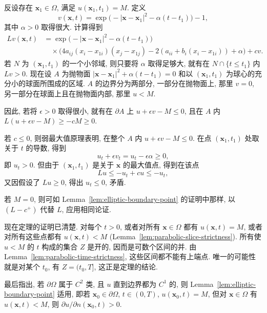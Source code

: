 \begin{Proof}
反设存在 $\bm{x}_1\in\Omega$, 满足 $u(\bm{x}_1,t_1)=M$. 定义
\begin{equation}\label{eq:parabolic-time-propagation-barrier}
v(\bm{x},t)=\exp\bigl(-|\bm{x}-\bm{x}_1|^2-\alpha(t-t_1)\bigr)-1,
\end{equation}
其中 $\alpha>0$ 取得很大. 计算得到\[
\begin{aligned}
Lv(\bm{x},t)&=\exp\bigl(-|\bm{x}-\bm{x}_1|^2-\alpha(t-t_1)\bigr)\\
&\quad\times\bigl(4a_{ij}(x_i-x_{1i})(x_j-x_{1j})-2(a_{ii}+b_i(x_i-x_{1i}))+\alpha\bigr)+cv.
\end{aligned}
\]若 $N$ 为 $(\bm{x}_1,t_1)$ 的一个小邻域, 则只要将 $\alpha$ 取得足够大, 就有在 $N\cap\{t\leq t_1\}$ 内 $Lv>0$. 现在设 $A$ 为抛物面 $|\bm{x}-\bm{x}_1|^2+\alpha(t-t_1)=0$ 和以 $(\bm{x}_1,t_1)$ 为球心的充分小的球面所围成的区域. $A$ 的边界分为两部分, 一部分在抛物面上, 那里 $v=0$, 另一部分在球面上且在抛物面内部, 那里 $u<M$.

因此, 若将 $\epsilon>0$ 取得很小, 就有在 $\partial A$ 上 $u+\epsilon v-M\leq0$, 且在 $A$ 内 $L(u+\epsilon v-M)\geq-cM\geq0$.

若 $c\leq0$, 则弱最大值原理表明, 在整个 $A$ 内 $u+\epsilon v-M\leq0$. 在点 $(\bm{x}_1,t_1)$ 处取关于 $t$ 的导数, 得到
\begin{equation}\label{eq:parabolic-terminal-time-derivative-bound}
u_t+\epsilon v_t=u_t-\epsilon\alpha\geq0,
\end{equation}
即 $u_t>0$. 但由于 $(\bm{x}_1,t_1)$ 是关于 $\bm{x}$ 的最大值点, 得到在该点
\begin{equation}\label{eq:parabolic-terminal-operator-bound}
Lu\leq-u_t+cu\leq-u_t,
\end{equation}
又因假设了 $Lu\geq0$, 得出 $u_t\leq0$, 矛盾.

若 $M=0$, 则可如 Lemma~\ref{lem:elliptic-boundary-point} 的证明中那样, 以 $(L-c^+)$ 代替 $L$, 应用相同论证.
\end{Proof}

现在定理的证明已清楚. 对每个 $t>0$, 或者对所有 $\bm{x}\in\Omega$ 都有 $u(\bm{x},t)=M$, 或者对所有这些点都有 $u(\bm{x},t)<M$ (Lemma~\ref{lem:parabolic-slice-strictness}). 所有使 $u<M$ 的 $t$ 构成的集合 $Z$ 是开的, 因而是可数个区间的并. 由 Lemma~\ref{lem:parabolic-time-strictness}, 这些区间都不能有上端点. 唯一的可能性就是对某个 $t_0$, 有 $Z=(t_0,T]$, 这正是定理的结论.

最后指出, 若 $\partial\Omega$ 属于 $C^2$ 类, 且 $u$ 直到边界都为 $C^1$ 的, 则 Lemma~\ref{lem:elliptic-boundary-point} 适用, 即若 $\bm{x}_0\in\partial\Omega$, $t\in(0,T)$, $u(\bm{x}_0,t)=M$, 但对 $\bm{x}\in\Omega$ 有 $u(\bm{x},t)<M$, 则 $\partial u/\partial n(\bm{x}_0,t)>0$.

